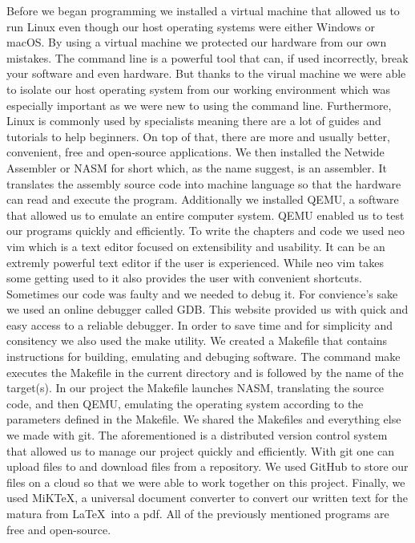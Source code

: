 \documentclass{article}
\begin{document}
Before we began programming we installed a virtual machine that 
allowed us to run Linux even though our host operating systems were either Windows or macOS. By using a virtual machine we protected our hardware from our own mistakes. The 
command line is a powerful tool that can, if used incorrectly, break your software and even hardware. But thanks to the virual machine we were able to isolate our host 
operating system from our working environment which was especially important as we were new to using the command line. Furthermore, Linux is commonly used by specialists 
meaning there are a lot of guides and tutorials to help beginners. On top of that, there are more and usually better, convenient, free and open-source applications. We 
then installed the Netwide Assembler or NASM for short which, as the name suggest, is an assembler. It translates the assembly source code into machine language
so that the hardware can read and execute the program. Additionally we installed QEMU, a software that allowed us to emulate an entire computer system. QEMU enabled us to 
test our programs quickly and efficiently. To write the chapters and code we used neo vim which is a text editor focused on extensibility and usability. 
It can be an extremly powerful text editor if the user is experienced. While neo vim takes some getting used to it also provides the user with convenient shortcuts. 
Sometimes our code was faulty and we needed to debug it. For convience's sake we used an online debugger called GDB. This website provided us with quick and easy access to 
a reliable debugger. In order to save time and for simplicity and consitency we also used the make utility. We created a Makefile that contains instructions for building, 
emulating and debuging software. The command make executes the Makefile in the current directory and is followed by the name of the target(s). In our project the Makefile 
launches NASM, translating the source code, and then QEMU, emulating the operating system according to the parameters defined in the Makefile. We shared the Makefiles and 
everything else we made with git. The aforementioned is a distributed version control system that allowed us to manage our project quickly and efficiently. With git one can 
upload files to and download files from a repository. We used GitHub to store our files on a cloud so that we were able to work together on this project. Finally, we used MiKTeX,
a universal document converter to convert our written text for the matura from \LaTeX \ into a pdf. All of the previously mentioned programs are free and open-source.
\end{document}
